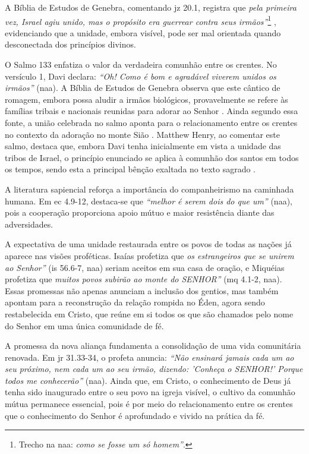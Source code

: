 A Bíblia de Estudos de Genebra, comentando \gls{jz} 20.1, registra que \textit{pela primeira vez, Israel agiu unido, mas o propósito era guerrear contra seus irmãos''}\footnote{Trecho na \gls{naa}: \textit{como se fosse um só homem''}.} \cite[p. 443]{bibliaGenebra}, evidenciando que a unidade, embora visível, pode ser mal orientada quando desconectada dos princípios divinos.

O Salmo 133 enfatiza o valor da verdadeira comunhão entre os crentes. No versículo 1, Davi declara: \textit{``Oh! Como é bom e agradável viverem unidos os irmãos''} (\gls{naa}). A Bíblia de Estudos de Genebra observa que este cântico de romagem, embora possa aludir a irmãos biológicos, provavelmente se refere às famílias tribais e nacionais reunidas para adorar ao Senhor \cite[p. 1053]{bibliaGenebra}. Ainda segundo essa fonte, a união celebrada no salmo aponta para o relacionamento entre os crentes no contexto da adoração no monte Sião \cite[p. 1053]{bibliaGenebra}. Matthew Henry, ao comentar este salmo, destaca que, embora Davi tenha inicialmente em vista a unidade das tribos de Israel, o princípio enunciado se aplica à comunhão dos santos em todos os tempos, sendo esta a principal bênção exaltada no texto sagrado \cite[p. 1077]{mathewHenry}.

A literatura sapiencial reforça a importância do companheirismo na caminhada humana. Em \gls{ec} 4.9-12, destaca-se que \textit{``melhor é serem dois do que um''} (\gls{naa}), pois a cooperação proporciona apoio mútuo e maior resistência diante das adversidades.

A expectativa de uma unidade restaurada entre os povos de todas as nações já aparece nas visões proféticas. Isaías profetiza que \textit{os estrangeiros que se unirem ao Senhor''} (\gls{is} 56.6-7, \gls{naa}) seriam aceitos em sua casa de oração, e Miquéias profetiza que \textit{muitos povos subirão ao monte do SENHOR''} (\gls{mq} 4.1-2, \gls{naa}). Essas promessas não apenas anunciam a inclusão dos gentios, mas também apontam para a reconstrução da relação rompida no Éden, agora sendo restabelecida em Cristo, que reúne em si todos os que são chamados pelo nome do Senhor em uma única comunidade de fé.

A promessa da nova aliança fundamenta a consolidação de uma vida comunitária renovada. Em \gls{jr} 31.33-34, o profeta anuncia: \textit{``Não ensinará jamais cada um ao seu próximo, nem cada um ao seu irmão, dizendo: 'Conheça o SENHOR!' Porque todos me conhecerão''} (\gls{naa}). Ainda que, em Cristo, o conhecimento de Deus já tenha sido inaugurado entre o seu povo na igreja visível, o cultivo da comunhão mútua permanece essencial, pois é por meio do relacionamento entre os crentes que o conhecimento do Senhor é aprofundado e vivido na prática da fé.

